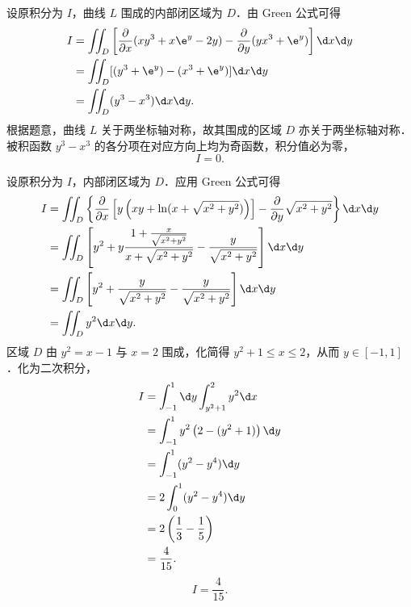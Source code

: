 \begin{solution}

    设原积分为 $I$，曲线 $L$ 围成的内部闭区域为 $D$．由 Green 公式可得
    \begin{equation}
        \begin{aligned}
            I & = \iint_D \left[ \frac{\partial}{\partial x}(xy^3+x\e^y-2y) - \frac{\partial}{\partial y}(yx^3+\e^y) \right] \d x \d y \\
              & = \iint_D[ (y^3+\e^y) - (x^3+\e^y) ] \d x \d y                                                                         \\
              & = \iint_D (y^3-x^3) \d x \d y.
        \end{aligned}
    \end{equation}
    根据题意，曲线 $L$ 关于两坐标轴对称，故其围成的区域 $D$ 亦关于两坐标轴对称．被积函数 $y^3-x^3$ 的各分项在对应方向上均为奇函数，积分值必为零，
    \begin{equation}
        I = \boxed{0}.
    \end{equation}


    设原积分为 $I$，内部闭区域为 $D$．应用 Green 公式可得
    \begin{equation}
        \begin{aligned}
            I & = \iint_D \left\{ \frac{\partial}{\partial x} \left[ y \left( xy + \ln(x+\sqrt{x^2+y^2}) \right) \right] - \frac{\partial}{\partial y}\sqrt{x^2+y^2} \right\} \d x \d y \\
              & = \iint_D \left[ y^2 + y \frac{1+\frac{x}{\sqrt{x^2+y^2}}}{x+\sqrt{x^2+y^2}} - \frac{y}{\sqrt{x^2+y^2}} \right] \d x \d y                                               \\
              & = \iint_D \left[ y^2 + \frac{y}{\sqrt{x^2+y^2}} - \frac{y}{\sqrt{x^2+y^2}} \right] \d x \d y                                                                            \\
              & = \iint_D y^2 \d x \d y.
        \end{aligned}
    \end{equation}
    区域 $D$ 由 $y^2 = x-1$ 与 $x = 2$ 围成，化简得 $y^2 + 1 \le x \le 2$，从而 $y \in [-1, 1]$．化为二次积分，
    \begin{equation}
        \begin{aligned}
            I & = \int_{-1}^1 \d y \int_{y^2+1}^2 y^2 \d x        \\
              & = \int_{-1}^1 y^2 \left( 2 - (y^2+1) \right) \d y \\
              & = \int_{-1}^1 (y^2-y^4) \d y                      \\
              & = 2 \int_0^1 (y^2-y^4) \d y                       \\
              & = 2 \left( \frac{1}{3} - \frac{1}{5} \right)      \\
              & = \frac{4}{15}.
        \end{aligned}
    \end{equation}
    \begin{equation}
        I = \boxed{\frac{4}{15}}.
    \end{equation}


\end{solution}
